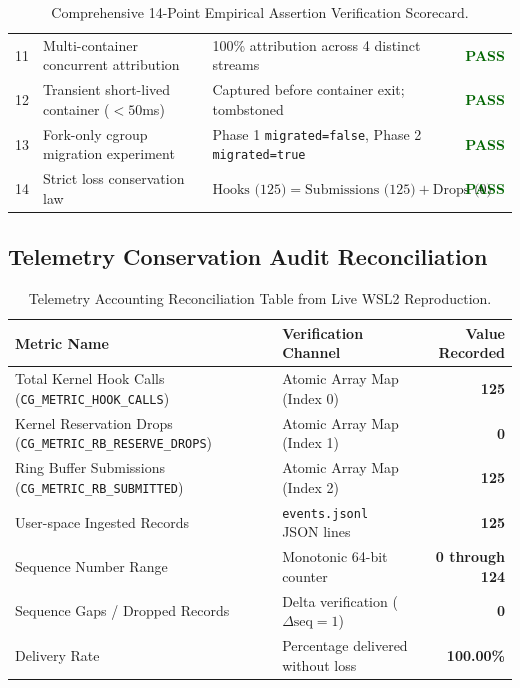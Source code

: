 \documentclass[11pt,a4paper]{article}
\begin{document}
\begin{table}[H]
\begin{tabularx}{\textwidth}{c >{\raggedright\arraybackslash}p{4.2cm} X c}
11 & Multi-container concurrent attribution & 100\% attribution across 4 distinct streams & \textbf{\textcolor{darkgreen}{PASS}} \\
12 & Transient short-lived container ($<50$ms) & Captured before container exit; tombstoned & \textbf{\textcolor{darkgreen}{PASS}} \\
13 & Fork-only cgroup migration experiment & Phase 1 \texttt{migrated=false}, Phase 2 \texttt{migrated=true} & \textbf{\textcolor{darkgreen}{PASS}} \\
14 & Strict loss conservation law & $\text{Hooks (125)} = \text{Submissions (125)} + \text{Drops (0)}$ & \textbf{\textcolor{darkgreen}{PASS}} \\
\bottomrule
\end{tabularx}
\caption{Comprehensive 14-Point Empirical Assertion Verification Scorecard.}
\label{tab:assertions}
\end{table}

\newpage

\subsection{Telemetry Conservation Audit Reconciliation}
\begin{table}[H]
\centering
\small
\begin{tabular}{llr}
\toprule
\textbf{Metric Name} & \textbf{Verification Channel} & \textbf{Value Recorded} \\
\midrule
Total Kernel Hook Calls (\texttt{CG\_METRIC\_HOOK\_CALLS}) & Atomic Array Map (Index 0) & \textbf{125} \\
Kernel Reservation Drops (\texttt{CG\_METRIC\_RB\_RESERVE\_DROPS}) & Atomic Array Map (Index 1) & \textbf{0} \\
Ring Buffer Submissions (\texttt{CG\_METRIC\_RB\_SUBMITTED}) & Atomic Array Map (Index 2) & \textbf{125} \\
User-space Ingested Records & \texttt{events.jsonl} JSON lines & \textbf{125} \\
Sequence Number Range & Monotonic 64-bit counter & \textbf{0 through 124} \\
Sequence Gaps / Dropped Records & Delta verification ($\Delta\text{seq} = 1$) & \textbf{0} \\
Delivery Rate & Percentage delivered without loss & \textbf{100.00\%} \\
\bottomrule
\end{tabular}
\caption{Telemetry Accounting Reconciliation Table from Live WSL2 Reproduction.}
\label{tab:accounting}
\end{table}
\end{document}
